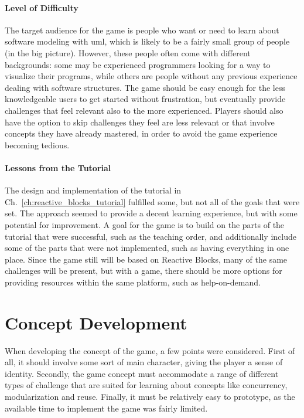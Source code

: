 \paragraph{Level of Difficulty} The target audience for the game is people who want or need to learn about software modeling with \gls{uml}, which is likely to be a fairly small group of people (in the big picture). However, these people often come with different backgrounds: some may be experienced programmers looking for a way to visualize their programs, while others are people without any previous experience dealing with software structures. The game should be easy enough for the less knowledgeable users to get started without frustration, but eventually provide challenges that feel relevant also to the more experienced. Players should also have the option to skip challenges they feel are less relevant or that involve concepts they have already mastered, in order to avoid the game experience becoming tedious.

\paragraph{Lessons from the Tutorial} The design and implementation of the tutorial in Ch.~\ref{ch:reactive_blocks_tutorial} fulfilled some, but not all of the goals that were set. The approach seemed to provide a decent learning experience, but with some potential for improvement. A goal for the game is to build on the parts of the tutorial that were successful, such as the teaching order, and additionally include some of the parts that were not implemented, such as having everything in one place. Since the game still will be based on Reactive Blocks, many of the same challenges will be present, but with a game, there should be more options for providing resources within the same platform, such as help-on-demand.

\section{Concept Development}
\label{sec:game_concept}
When developing the concept of the game, a few points were considered. First of all, it should involve some sort of main character, giving the player a sense of identity. Secondly, the game concept must accommodate a range of different types of challenge that are suited for learning about concepts like concurrency, modularization and reuse. Finally, it must be relatively easy to prototype, as the available time to implement the game was fairly limited.

